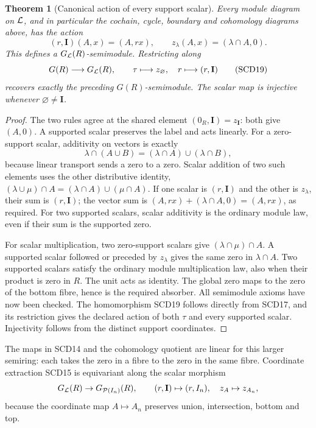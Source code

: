 \documentclass[11pt,a4paper]{article}
\newtheorem{theorem}{Theorem}[section]
\theoremstyle{definition}\newtheorem{definition}[theorem]{Definition}
\begin{document}
\begin{theorem}[Canonical action of every support scalar]
Every module diagram on \(\mathcal L\), and in particular the cochain,
cycle, boundary and cohomology diagrams above, has the action
\[
 (r,\mathbf I)(A,x)=(A,rx),\qquad
 z_\lambda(A,x)=(\lambda\cap A,0).
 \tag{SCD18}
\]
This defines a \(G_{\mathcal L}(R)\)-semimodule. Restricting along
\[
 G(R)\longrightarrow G_{\mathcal L}(R),\qquad
 \tau\longmapsto z_\varnothing,\quad
 r\longmapsto(r,\mathbf I)
 \tag{SCD19}
\]
recovers exactly the preceding \(G(R)\)-semimodule.
The scalar map is injective whenever \(\varnothing\ne\mathbf I\).
\end{theorem}
\begin{proof}
The two rules agree at the shared element
\((0_R,\mathbf I)=z_{\mathbf I}\): both give \((A,0)\).
A supported scalar preserves the label and acts linearly. For a
zero-support scalar, additivity on vectors is exactly
\[
 \lambda\cap(A\cup B)=(\lambda\cap A)\cup(\lambda\cap B),
\]
because linear transport sends a zero to a zero. Scalar addition
of two such elements uses the other distributive identity,
\((\lambda\cup\mu)\cap A=(\lambda\cap A)\cup(\mu\cap A)\).
If one scalar is \((r,\mathbf I)\) and the other is \(z_\lambda\),
their sum is \((r,\mathbf I)\); the vector sum is
\((A,rx)+(\lambda\cap A,0)=(A,rx)\), as required.
For two supported scalars, scalar additivity is the ordinary
module law, even if their sum is the supported zero.

For scalar multiplication, two zero-support scalars give
\((\lambda\cap\mu)\cap A\). A supported scalar followed or preceded
by \(z_\lambda\) gives the same zero in \(\lambda\cap A\).
Two supported scalars satisfy the ordinary module multiplication
law, also when their product is zero in \(R\).
The unit acts as identity. The global zero maps to the zero of
the bottom fibre, hence is the required absorber. All semimodule
axioms have now been checked. The homomorphism SCD19 follows
directly from SCD17, and its restriction gives the declared action
of both \(\tau\) and every supported scalar. Injectivity follows
from the distinct support coordinates.
\end{proof}

The maps in SCD14 and the cohomology quotient are linear for this
larger semiring: each takes the zero in a fibre to the zero in the
same fibre. Coordinate extraction SCD15 is equivariant along the
scalar morphism
\[
 G_{\mathcal L}(R)\to G_{\mathcal P(I_n)}(R),\qquad
 (r,\mathbf I)\mapsto(r,I_n),\quad z_A\mapsto z_{A_n},
\]
because the coordinate map \(A\mapsto A_n\) preserves union,
intersection, bottom and top.
\end{document}
